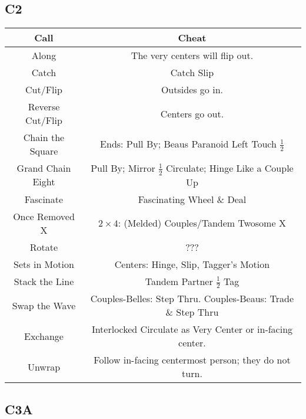 \documentclass{article}
\begin{document}
\subsection*{C2}
\begin{center}
  \begin{tabular}{c | c}
    Call & Cheat \\ \hline
    Along & The very centers will flip out. \\
    Catch & Catch Slip \\
    Cut/Flip & Outsides go in. \\
    Reverse Cut/Flip & Centers go out. \\
    Chain the Square & Ends: Pull By; Beaus Paranoid Left Touch $\frac12$ \\
    Grand Chain Eight & Pull By; Mirror $\frac12$ Circulate; Hinge Like a Couple Up \\
    Fascinate & Fascinating Wheel \& Deal \\
    Once Removed X & $2\times4$: (Melded) Couples/Tandem Twosome X \\
    Rotate & ??? \\
    Sets in Motion & Centers: Hinge, Slip, Tagger's Motion \\
    Stack the Line & Tandem Partner $\frac12$ Tag \\
    Swap the Wave & Couples-Belles: Step Thru.  Couples-Beaus: Trade \& Step Thru \\
    Exchange & Interlocked Circulate as Very Center or in-facing center. \\
    Unwrap & Follow in-facing centermost person; they do not turn. \\
  \end{tabular}
\end{center}

\subsection*{C3A}
\end{document}

